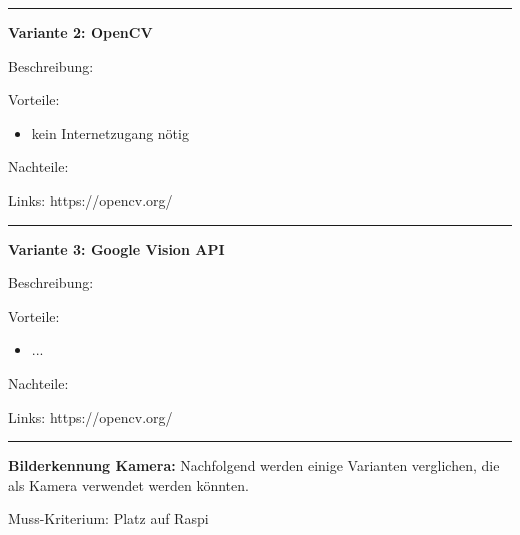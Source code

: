 \vspace{5pt}
\hrule

\textbf{Variante 2: OpenCV}

Beschreibung:

Vorteile:
\begin{itemize}
    \item kein Internetzugang nötig
\end{itemize}

Nachteile:

Links: https://opencv.org/

\vspace{5pt}
\hrule

\textbf{Variante 3: Google Vision API}

Beschreibung:

Vorteile:
\begin{itemize}
    \item ...
\end{itemize}

Nachteile:

Links: https://opencv.org/

\vspace{5pt}
\hrule
\vspace{10pt}

\textbf{Bilderkennung Kamera:} Nachfolgend werden einige Varianten verglichen, die als Kamera verwendet werden könnten.

Muss-Kriterium: Platz auf Raspi